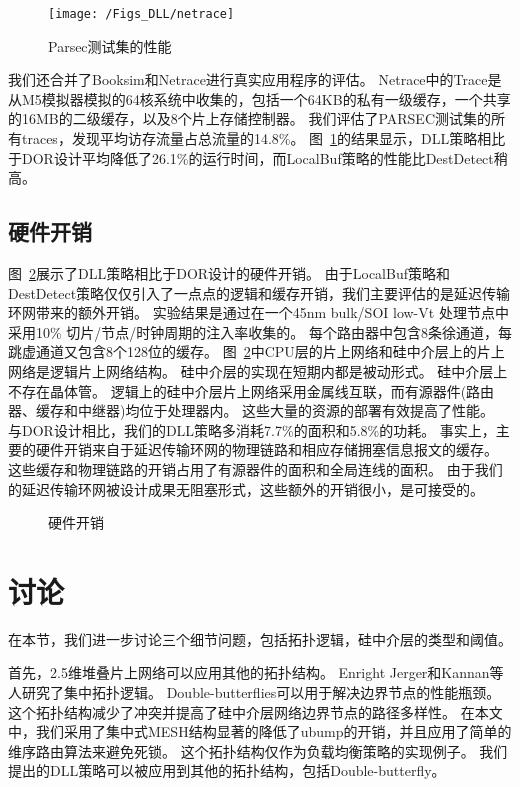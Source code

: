 \begin{figure}[htbp] %
  \centering
  \texttt{[image: /Figs\_DLL/netrace]}
  \caption{Parsec测试集的性能}
  \label{fig:netrace}
\end{figure}

我们还合并了Booksim和Netrace进行真实应用程序的评估。
Netrace中的Trace是从M5模拟器模拟的64核系统中收集的，包括一个64KB的私有一级缓存，一个共享的16MB的二级缓存，以及8个片上存储控制器。
我们评估了PARSEC测试集的所有traces，发现平均访存流量占总流量的14.8\%。
图~\ref{fig:netrace}的结果显示，DLL策略相比于DOR设计平均降低了26.1\%的运行时间，而LocalBuf策略的性能比DestDetect稍高。

\subsection{硬件开销}

图~\ref{fig:hardware}展示了DLL策略相比于DOR设计的硬件开销。
由于LocalBuf策略和DestDetect策略仅仅引入了一点点的逻辑和缓存开销，我们主要评估的是延迟传输环网带来的额外开销。
实验结果是通过在一个45nm bulk/SOI low-Vt 处理节点中采用10\% 切片/节点/时钟周期的注入率收集的。
每个路由器中包含8条徐通道，每跳虚通道又包含8个128位的缓存。
图~\ref{fig:hardware}中CPU层的片上网络和硅中介层上的片上网络是逻辑片上网络结构。
硅中介层的实现在短期内都是被动形式。
硅中介层上不存在晶体管。
逻辑上的硅中介层片上网络采用金属线互联，而有源器件(路由器、缓存和中继器)均位于处理器内。
这些大量的资源的部署有效提高了性能。
与DOR设计相比，我们的DLL策略多消耗7.7\%的面积和5.8\%的功耗。
事实上，主要的硬件开销来自于延迟传输环网的物理链路和相应存储拥塞信息报文的缓存。
这些缓存和物理链路的开销占用了有源器件的面积和全局连线的面积。
由于我们的延迟传输环网被设计成果无阻塞形式，这些额外的开销很小，是可接受的。

\begin{figure}[htb]
\centering
{} 
\caption{硬件开销}
\label{fig:hardware}
\end{figure}


\section{讨论}

在本节，我们进一步讨论三个细节问题，包括拓扑逻辑，硅中介层的类型和阈值。

首先，2.5维堆叠片上网络可以应用其他的拓扑结构。
Enright Jerger和Kannan等人研究了集中拓扑逻辑。
Double-butterflies可以用于解决边界节点的性能瓶颈。
这个拓扑结构减少了冲突并提高了硅中介层网络边界节点的路径多样性。
在本文中，我们采用了集中式MESH结构显著的降低了ubump的开销，并且应用了简单的维序路由算法来避免死锁。
这个拓扑结构仅作为负载均衡策略的实现例子。
我们提出的DLL策略可以被应用到其他的拓扑结构，包括Double-butterfly。

